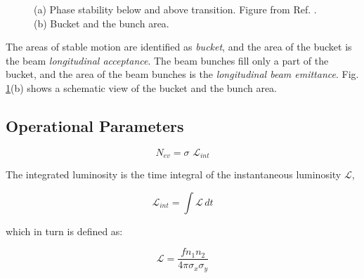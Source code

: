 \begin{figure}[ht]
\centering
{}
\caption{(a) Phase stability below and above transition. Figure from Ref. \cite{Tecker:2016mlq}. (b) Bucket and the bunch area.}
\label{fig:lhc:phase}
\end{figure}

The areas of stable motion are identified as \textit{bucket}, and the area of the bucket is the beam \textit{longitudinal acceptance}. The beam bunches fill only a part of the bucket, and the area of the beam bunches is the \textit{longitudinal beam emittance}. Fig. \ref{fig:lhc:phase}(b) shows a schematic view of the bucket and the bunch area.

\subsection{Operational Parameters}

\begin{equation}
\label{eq:cern:nev}
N_{ev} = \sigma \,\, \mathcal{L}_{int}
\end{equation}

The integrated luminosity is the time integral of the instantaneous luminosity $\mathcal{L}$, 

\begin{equation}
\label{eq:cern:intlumi}
\mathcal{L}_{int} = \int \mathcal{L} \, dt
\end{equation}

which in turn is defined as:

\begin{equation}
\label{eq:cern:lumi}
\mathcal{L}=\frac{f n_1 n_2}{4 \pi \sigma_x \sigma_y}
\end{equation}


